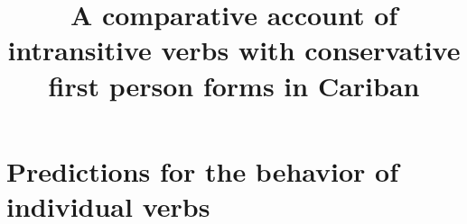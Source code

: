 \title{A comparative account of intransitive verbs with conservative first person forms in Cariban}
\date{}


%

%









\newpage
\glosssection{}
\printbibliography

\newpage
\appendix
\section{Predictions for the behavior of individual verbs}












